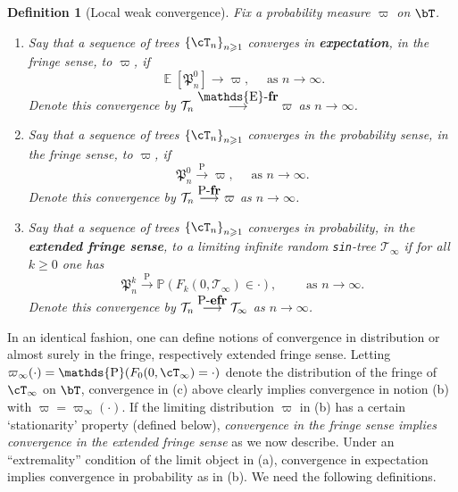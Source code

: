 \documentclass[letterpaper,11pt,reqno]{amsart}
\newenvironment{enumeratea}{\begin{enumerate}[\upshape a)]\setlength{\itemsep}{1ex}}{\end{enumerate}}
\newtheorem{defn}[thm]{Definition}
\theoremstyle{definition}
\renewcommand{\geq}{\geqslant}
\newcommand{\set}[1]{\left\{#1\right\}}
\newcommand{\probc}{\stackrel{\mathrm{P}}{\longrightarrow}}
\newcommand{\fP}{\mathfrak{P}}\newcommand{\fQ}{\mathfrak{Q}}\newcommand{\fR}{\mathfrak{R}}
\DeclareMathOperator{\E}{\mathds{E}}
\DeclareMathOperator{\pr}{\mathds{P}}
\newcommand{\TT}{\mathcal{T}}
\newcommand{\prob}{\mathbb{P}}
\newcommand{\probfr}{\stackrel{\mbox{$\operatorname{P}$-\bf fr}}{\longrightarrow}}
\newcommand{\probcrf}{\stackrel{\mbox{$\operatorname{P}$-\bf efr}}{\longrightarrow}}
\newcommand{\Efr}{\stackrel{\mbox{$\E$-\bf fr}}{\longrightarrow}}
\begin{document}
\begin{defn}[Local weak convergence]
	\label{def:local-weak}
 Fix a probability measure $\varpi$ on $\bT$.
	\begin{enumeratea}
 \item \label{it:fringe-exp} Say that a sequence of trees $\set{\cT_n}_{n\geq 1}$ converges in {\bf expectation}, in the fringe sense, to $\varpi$, if \[\E[\fP_n^{0}] \to \varpi, \quad \text{ as } n\to\infty. \]
 Denote this convergence by $\TT_n\Efr \varpi$ as $n\to\infty$.
	    \item \label{it:fringe-a}  Say that a sequence of trees $\set{\cT_n}_{n\geq 1}$ converges in the probability sense, in the fringe sense, to $\varpi$, if \[\fP_n^{0} \probc \varpi, \quad \text{ as } n\to\infty. \]
	Denote this convergence by $\TT_n\probfr \varpi$ as $n\to\infty$.
	    \item \label{it:fringe-b} Say that a sequence of trees $\set{\cT_n}_{n\geq 1}$ converges in probability, in the {\bf extended fringe sense}, to a limiting infinite random {\tt sin}-tree $\TT_{\infty}$ if for all $k\geq 0$ one has
	  \[\fP_n^k \probc \prob\left(F_k(0,\TT_{\infty}) \in \cdot \right), \qquad \text{ as } n\to\infty. \]
	Denote this convergence by $\TT_n\probcrf \TT_{\infty}$ as $n\to\infty$.
	\end{enumeratea}
\end{defn} 
In an identical fashion, one can define notions of convergence in distribution or almost surely in the fringe, respectively extended fringe sense. 
Letting $\varpi_{\infty}(\cdot) = \pr(F_0(0, \cT_{\infty}) = \cdot)$ denote the distribution of the fringe of $\cT_\infty$ on $\bT$, convergence in (c) above clearly implies convergence in notion (b) with $\varpi =\varpi_{\infty}(\cdot) $.
If the limiting distribution $\varpi$ in (b) has a certain `stationarity' property (defined below), \emph{convergence in the fringe sense implies convergence in the extended fringe sense} as we now describe. Under an ``extremality'' condition of the limit object in (a), convergence in expectation implies convergence in probability as in (b). We need the following definitions.
\end{document}
